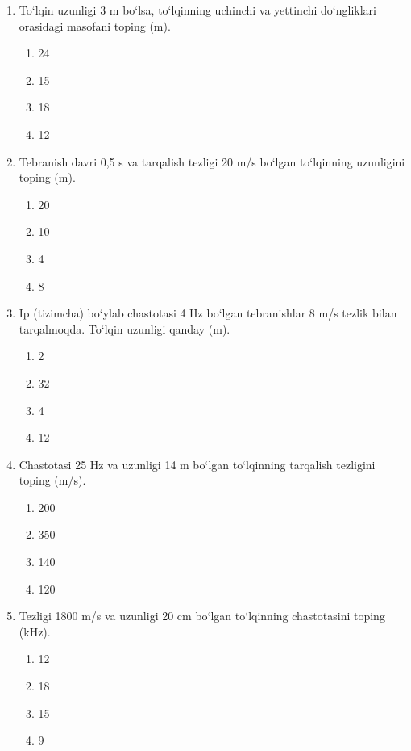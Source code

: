 \begin{enumerate}
\item To‘lqin uzunligi 3 m bo‘lsa, to‘lqinning uchinchi va yettinchi do‘ngliklari orasidagi masofani toping (m).
\begin{enumerate}[label=\Alph*)]
\item 24
\item 15
\item 18
\item 12

\end{enumerate}

\item Tebranish davri 0,5 s va tarqalish tezligi 20 m/s bo‘lgan to‘lqinning uzunligini toping (m).
\begin{enumerate}[label=\Alph*)]
\item 20
\item 10
\item 4
\item 8
\end{enumerate}

\item Ip (tizimcha) bo‘ylab chastotasi 4 Hz bo‘lgan tebranishlar 8 m/s tezlik bilan tarqalmoqda. To‘lqin uzunligi qanday (m).
\begin{enumerate}[label=\Alph*)]
\item 2
\item 32
\item 4
\item 12

\end{enumerate}

\item Chastotasi 25 Hz va uzunligi 14 m bo‘lgan to‘lqinning tarqalish tezligini toping (m/s).
\begin{enumerate}[label=\Alph*)]
\item 200
\item 350
\item 140
\item 120

\end{enumerate}

\item Tezligi 1800 m/s va uzunligi 20 cm bo‘lgan to‘lqinning chastotasini toping (kHz).
\begin{enumerate}[label=\Alph*)]
\item 12
\item 18
\item 15
\item 9
\end{enumerate}


\end{enumerate}
